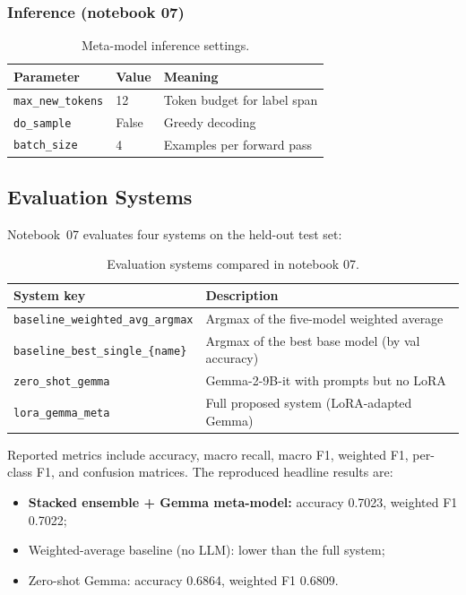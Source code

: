 \documentclass[11pt,a4paper]{article}
\begin{document}
\subsubsection{Inference (notebook 07)}
\begin{table}[htbp]
  \centering
  \caption{Meta-model inference settings.}
  \label{tab:inference-hparams}
  \begin{tabular}{@{}lll@{}}
    \toprule
    Parameter & Value & Meaning \\
    \midrule
    \texttt{max\_new\_tokens} & 12 & Token budget for label span \\
    \texttt{do\_sample} & False & Greedy decoding \\
    \texttt{batch\_size} & 4 & Examples per forward pass \\
    \bottomrule
  \end{tabular}
\end{table}

\subsection{Evaluation Systems}
Notebook~07 evaluates four systems on the held-out test set:

\begin{table}[htbp]
  \centering
  \caption{Evaluation systems compared in notebook 07.}
  \label{tab:eval-systems}
  \begin{tabular}{@{}ll@{}}
    \toprule
    System key & Description \\
    \midrule
    \texttt{baseline\_weighted\_avg\_argmax} & Argmax of the five-model weighted average \\
    \texttt{baseline\_best\_single\_\{name\}} & Argmax of the best base model (by val accuracy) \\
    \texttt{zero\_shot\_gemma} & Gemma-2-9B-it with prompts but no LoRA \\
    \texttt{lora\_gemma\_meta} & Full proposed system (LoRA-adapted Gemma) \\
    \bottomrule
  \end{tabular}
\end{table}

Reported metrics include accuracy, macro recall, macro F1, weighted F1, per-class F1, and confusion matrices. The reproduced headline results are:
\begin{itemize}[nosep]
  \item \textbf{Stacked ensemble + Gemma meta-model:} accuracy 0.7023, weighted F1 0.7022;
  \item Weighted-average baseline (no LLM): lower than the full system;
  \item Zero-shot Gemma: accuracy 0.6864, weighted F1 0.6809.
\end{itemize}
\end{document}
